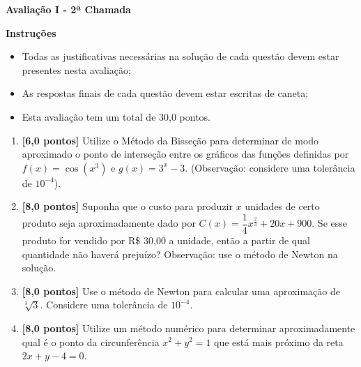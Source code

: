 \documentclass[12pt,a4paper]{article}
\begin{document}
\begin{center}
 \textbf{Avaliação I - 2ª Chamada}
\end{center}

\textbf{Instruções}
\begin{itemize}
 \item Todas as justificativas necessárias na solução de cada questão devem 
 estar presentes nesta avaliação;
 \item As respostas finais de cada questão devem estar escritas de caneta;
 \item Esta avaliação tem um total de 30,0 pontos.
\end{itemize}

\begin{enumerate}
  \item \textbf{[6,0 pontos]} Utilize o Método da Bisseção para determinar de modo
  aproximado o ponto de interseção entre os gráficos das funções definidas por
  $f(x) = \cos\left(x^3\right)$ e $g(x) = 3^x - 3$. (Observação: considere uma
  tolerância de $10^{-4}$).

  \item \textbf{[8,0 pontos]} Suponha que o custo para produzir $x$ unidades de certo produto
  seja aproximadamente dado por $C(x) = \dfrac{1}{4}x^{\frac{2}{3}} + 20x + 900$. Se esse
  produto for vendido por R\$ 30,00 a unidade, então a partir de qual quantidade não
  haverá prejuízo? Observação: use o método de Newton na solução.

  \item \textbf{[8,0 pontos]} Use o método de Newton para calcular uma aproximação 
  de $\sqrt[3]{3}$. Considere uma tolerância de $10^{-4}$.

  \item \textbf{[8,0 pontos]} Utilize um método numérico para determinar aproximadamente qual é o ponto da
  circunferência $x^2 + y^2 = 1$ que está mais próximo da reta $2x + y - 4 = 0$.

\end{enumerate}
\end{document}
